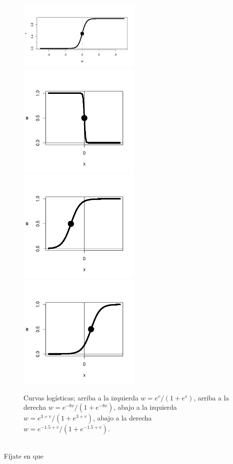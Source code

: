 \begin{figure}[htb]
\begin{center}
	\includegraphics[width=6cm]{../fig/Cap13-CurvaLogistica1.png}
	\includegraphics[width=6cm]{../fig/Cap13-CurvaLogistica2.png}\\
	\includegraphics[width=6cm]{../fig/Cap13-CurvaLogistica3.png}
	\includegraphics[width=6cm]{../fig/Cap13-CurvaLogistica4.png}
\caption{Curvas logísticas;
	arriba a la izquierda $w=e^{v}/(1+e^{v})$,
	arriba a la derecha $w=e^{-8v}/(1+e^{-8v})$,
	abajo a la izquierda $w=e^{3+v}/(1+e^{3+v})$,
	abajo a la derecha $w=e^{-1.5+v}/(1+e^{-1.5+v})$.
}
\label{cap13:fig:FiguraCurvaLogistica}
\end{center}
\end{figure}
\quad\\
\noindent Fíjate en que

